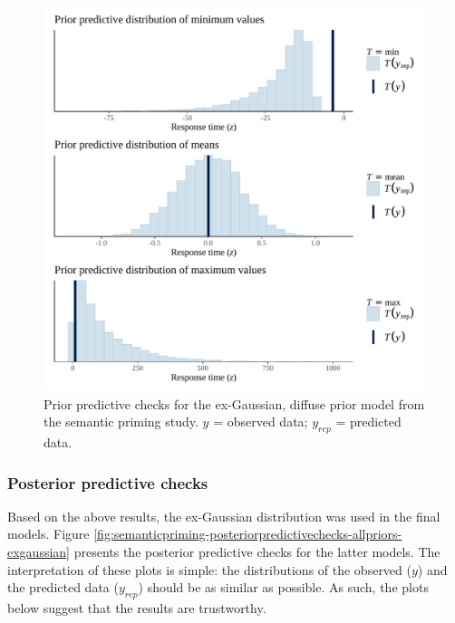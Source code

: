 \documentclass[
  12pt,
  man,floatsintext]{apa7}
\begin{document}
\begin{figure}

{\centering \includegraphics[width=0.8\linewidth]{../semanticpriming/bayesian_analysis/prior_predictive_checks/plots/semanticpriming_priorpredictivecheck_diffusepriors_exgaussian} 

}

\caption{Prior predictive checks for the ex-Gaussian, diffuse prior model from the semantic priming study. \(y\) = observed data; \(y_{rep}\) = predicted data.}\label{fig:semanticpriming-priorpredictivecheck-diffusepriors-exgaussian}
\end{figure}

\hypertarget{posterior-predictive-checks}{%
\subsubsection{Posterior predictive checks}\label{posterior-predictive-checks}}

Based on the above results, the ex-Gaussian distribution was used in the final models. Figure \ref{fig:semanticpriming-posteriorpredictivechecks-allpriors-exgaussian} presents the posterior predictive checks for the latter models. The interpretation of these plots is simple: the distributions of the observed (\(y\)) and the predicted data (\(y_{rep}\)) should be as similar as possible. As such, the plots below suggest that the results are trustworthy.
\end{document}
